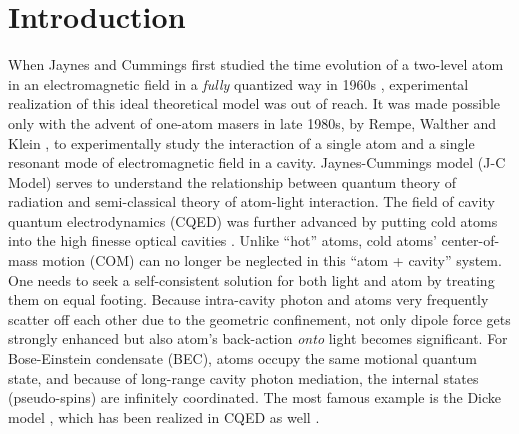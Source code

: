 \documentclass[atoms,article,submit,moreauthors,pdftex,12pt,a4paper]{mdpi}
\begin{document}

\section{Introduction}

When Jaynes and Cummings first studied the time evolution of a two-level atom in an electromagnetic field in a {\em fully} quantized way in 1960s \cite{JCM}, experimental realization of this ideal theoretical model was out of reach. It was made possible only with the advent of one-atom masers in late 1980s, by Rempe, Walther and Klein \cite{exp1987}, to experimentally study the interaction of a single atom and a single resonant mode of electromagnetic field in a cavity. Jaynes-Cummings model (J-C Model) serves to understand the relationship between quantum theory of radiation and semi-classical theory of atom-light interaction. 
The field of cavity quantum electrodynamics (CQED) was further advanced by putting cold atoms into the high finesse optical cavities \cite{cavity1, cavity2, cavity3}. Unlike ``hot'' atoms, cold atoms' center-of-mass motion (COM) can no longer be neglected in this ``atom + cavity'' system. One needs to seek a self-consistent solution for both light and atom by treating them on equal footing. Because intra-cavity photon and atoms very frequently scatter off each other due to the geometric confinement, not only dipole force gets strongly enhanced but also atom's back-action {\em onto} light becomes significant. For Bose-Einstein condensate (BEC), atoms occupy the same motional quantum state, 
and because of long-range cavity photon mediation, the internal states (pseudo-spins) are infinitely coordinated. The most famous example is the Dicke model \cite{Dicke}, which has been realized in CQED as well \cite{Esslinger2010}.
\end{document}
